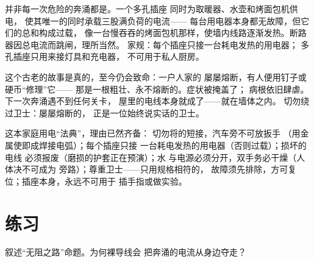 \begin{example}[过载：礼貌的奔涌]\label{ex:g7:short-circuits-safety:overload}
并非每一次危险的奔涌都是。一个多孔插座
同时为取暖器、水壶和烤面包机供电，
使其唯一的同时承载三股满负荷的电流——
每台用电器本身都无故障，但它们的总和构成过载，
像一台慢吞吞的烤面包机那样，使墙内线路逐渐发热。断路器因总电流而跳闸，理所当然。
家规：每个插座只接一台耗电发热的用电器；
多孔插座只用来接灯具和充电器，
不可用于私人厨房。
\end{example}

\begin{remark}[禁止的修理]\label{rem:g7:short-circuits-safety:nail}
这个古老的故事是真的，至今仍会致命：一户人家的
屡屡熔断，有人便用钉子或硬币“修理”它——
那是一根粗壮、永不熔断的。症状被掩盖了；
病根依旧肆虐。下一次奔涌遇不到任何关卡，
屋里的电线本身就成了——就在墙体之内。
切勿绕过卫士：屡屡熔断的，
正是一位始终说实话的卫士。
\end{remark}

\begin{remark}[规则的最终形式]\label{rem:g7:short-circuits-safety:rules}
这本家庭用电“法典”，理由已然齐备：
切勿将的短接，汽车旁不可放扳手
（用金属使即成焊接电弧）；每个插座只接
一台耗电发热的用电器（否则过载）；损坏的电线
必须报废（磨损的护套正在预演）；水
与电源必须分开，双手务必干燥（人体决不可成为
旁路）；尊重卫士——只用规格相符的，
故障须先排除，方可复位；插座本身，永远不可用于
插手指或做实验。
\end{remark}

\section{练习}

\begin{exercise}[$\star$]\label{exo:g7:short-circuits-safety:1}
叙述“无阻之路”命题。为何裸导线会
把奔涌的电流从身边夺走？
\end{exercise}

